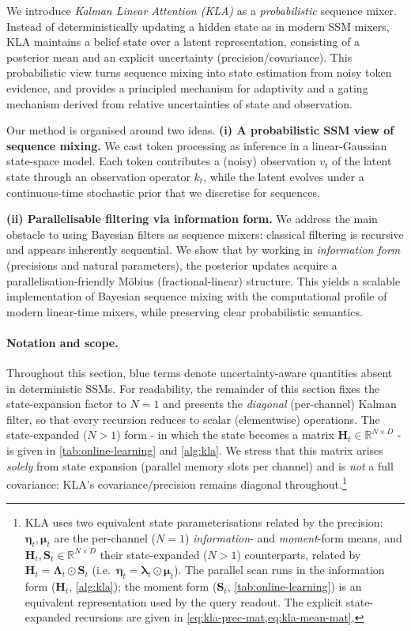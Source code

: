 \documentclass{article}
\newcommand{\unc}[1]{\textcolor{UncBlue}{#1}}
\newcommand{\our}{\textsc{KLA}\xspace}
\begin{document}
We introduce \emph{Kalman Linear Attention (KLA)} as a \emph{probabilistic} sequence mixer. Instead of deterministically updating a hidden state as in modern SSM mixers, KLA maintains a belief state over a latent representation, consisting of a posterior mean and an explicit uncertainty (precision/covariance). This probabilistic view turns sequence mixing into state estimation from noisy token evidence, and provides a principled mechanism for adaptivity and a gating mechanism derived from relative uncertainties of state and observation.



Our method is organised around two ideas.
\textbf{(i) A probabilistic SSM view of sequence mixing.}
We cast token processing as inference in a linear-Gaussian state-space model. Each token contributes a (noisy) observation $v_t$ of the latent state through an observation operator $k_t$, while the latent evolves under a continuous-time stochastic prior that we discretise for sequences. 

\textbf{(ii) Parallelisable filtering via information form.}
We address the main obstacle to using Bayesian filters as sequence mixers: classical filtering is recursive and appears inherently sequential. We show that by working in \emph{information form} (precisions and natural parameters), the posterior updates acquire a parallelisation-friendly M\"{o}bius (fractional-linear) structure. This yields a scalable implementation of Bayesian sequence mixing with the computational profile of modern linear-time mixers, while preserving clear probabilistic semantics.


\paragraph{Notation and scope.}
Throughout this section, \unc{blue terms} denote uncertainty-aware quantities absent in deterministic SSMs. For readability, the remainder of this section fixes the state-expansion factor to $N{=}1$ and presents the \emph{diagonal} (per-channel) Kalman filter, so that every recursion reduces to scalar (elementwise) operations. The state-expanded ($N{>}1$) form - in which the state becomes a matrix $\mathbf{H}_t\in\mathbb{R}^{N\times D}$ - is given in \cref{tab:online-learning} and \cref{alg:kla}. We stress that this matrix arises \emph{solely} from state expansion (parallel memory slots per channel) and is \emph{not} a full covariance: \our's covariance/precision remains diagonal throughout.\footnote{\label{fn:notation}\our uses two equivalent state parameterisations related by the precision: $\boldsymbol{\eta}_t,\boldsymbol{\mu}_t$ are the per-channel ($N{=}1$) \emph{information}- and \emph{moment}-form means, and $\mathbf{H}_t,\mathbf{S}_t\!\in\!\mathbb{R}^{N\times D}$ their state-expanded ($N{>}1$) counterparts, related by $\mathbf{H}_t=\boldsymbol{\Lambda}_t\odot\mathbf{S}_t$ (i.e.\ $\boldsymbol{\eta}_t=\boldsymbol{\lambda}_t\odot\boldsymbol{\mu}_t$). The parallel scan runs in the information form ($\mathbf{H}_t$, \cref{alg:kla}); the moment form ($\mathbf{S}_t$, \cref{tab:online-learning}) is an equivalent representation used by the query readout. The explicit state-expanded recursions are given in \cref{eq:kla-prec-mat,eq:kla-mean-mat}.}
\end{document}
